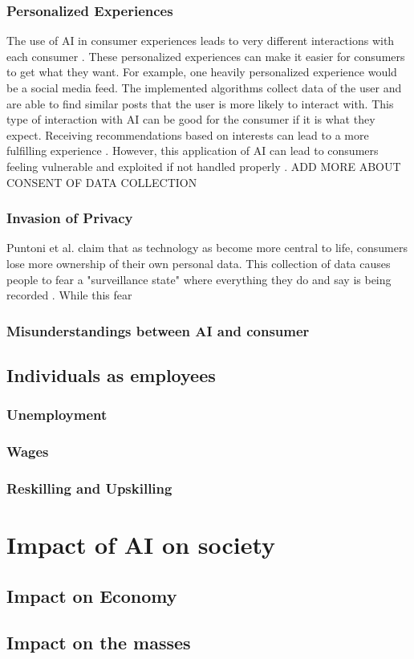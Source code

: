 \documentclass[12pt, man]{apa6}
\begin{document}
\subsubsection*{Personalized Experiences}
The use of AI in consumer experiences leads to very different interactions with each consumer \parencite{Puntoni2021}.  These personalized experiences can make it easier for consumers to get what they want.  For example, one heavily personalized experience would be a social media feed.  The implemented algorithms collect data of the user and are able to find similar posts that the user is more likely to interact with.
This type of interaction with AI can be good for the consumer if it is what they expect.  Receiving recommendations based on interests can lead to a more fulfilling experience \parencite{Kumar2019}.  However, this application of AI can lead to consumers feeling vulnerable and exploited if not handled properly \parencite{Aguirre2015}.  ADD MORE ABOUT CONSENT OF DATA COLLECTION

\subsubsection*{Invasion of Privacy}
Puntoni et al. claim that as technology as become more central to life, consumers lose more ownership of their own personal data. This collection of data causes people to fear a "surveillance state" where everything they do and say is being recorded \parencite*{Puntoni2021}.  While this fear

\subsubsection*{Misunderstandings between AI and consumer}

\subsection*{Individuals as employees}
\subsubsection*{Unemployment}
\subsubsection*{Wages}
\subsubsection*{Reskilling and Upskilling}

\section*{Impact of AI on society}
\subsection*{Impact on Economy}

\subsection*{Impact on the masses}

\printbibliography
\end{document}
